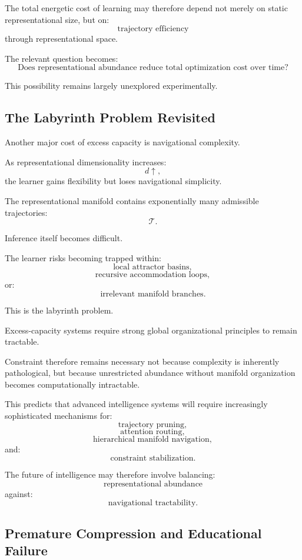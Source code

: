 \documentclass[12pt,a4paper]{article}
\begin{document}
The total energetic cost of learning may therefore depend not merely on static representational size, but on:
\[
\text{trajectory efficiency}
\]
through representational space.

The relevant question becomes:
\[
\text{Does representational abundance reduce total optimization cost over time?}
\]

This possibility remains largely unexplored experimentally.

\subsection{The Labyrinth Problem Revisited}

Another major cost of excess capacity is navigational complexity.

As representational dimensionality increases:
\[
d
\uparrow,
\]
the learner gains flexibility but loses navigational simplicity.

The representational manifold contains exponentially many admissible trajectories:
\[
\mathcal{T}.
\]

Inference itself becomes difficult.

The learner risks becoming trapped within:
\[
\text{local attractor basins},
\]
\[
\text{recursive accommodation loops},
\]
or:
\[
\text{irrelevant manifold branches}.
\]

This is the labyrinth problem.

Excess-capacity systems require strong global organizational principles to remain tractable.

Constraint therefore remains necessary not because complexity is inherently pathological, but because unrestricted abundance without manifold organization becomes computationally intractable.

This predicts that advanced intelligence systems will require increasingly sophisticated mechanisms for:
\[
\text{trajectory pruning},
\]
\[
\text{attention routing},
\]
\[
\text{hierarchical manifold navigation},
\]
and:
\[
\text{constraint stabilization}.
\]

The future of intelligence may therefore involve balancing:
\[
\text{representational abundance}
\]
against:
\[
\text{navigational tractability}.
\]

\subsection{Premature Compression and Educational Failure}
\end{document}
